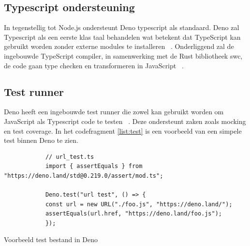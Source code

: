 \subsection{Typescript ondersteuning}
In tegenstellig tot Node.js ondersteunt Deno typescript als standaard. 
Deno zal Typescript als een eerste klas taal behandelen wat betekent dat TypeScript kan gebruikt worden zonder externe modules te installeren ~\autocite{DenoLand2023}.
Onderliggend zal de ingebouwde TypeScript compiler, in samenwerking met de Rust bibliotheek swc, 
de code gaan type checken en transformeren in JavaScript ~\autocite{DenoLand2023}.

\subsection{Test runner}
Deno heeft een ingebouwde test runner die zowel kan gebruikt worden om JavaScript als Typescript code te testen ~\autocite{DenoLand2023}.
Deze ondersteunt zaken zoals mocking en test coverage. In het codefragment \ref{list:test} is een voorbeeld van een simpele test binnen Deno te zien.

\begin{listing}[H]
    \centering
    \begin{verbatim}
            // url_test.ts
            import { assertEquals } from "https://deno.land/std@0.219.0/assert/mod.ts";

            Deno.test("url test", () => {
            const url = new URL("./foo.js", "https://deno.land/");
            assertEquals(url.href, "https://deno.land/foo.js");
            });
        \end{verbatim}
        \caption{\label{list:test}Voorbeeld test bestand in Deno ~\autocite{DenoLand2023}} 
\end{listing}

